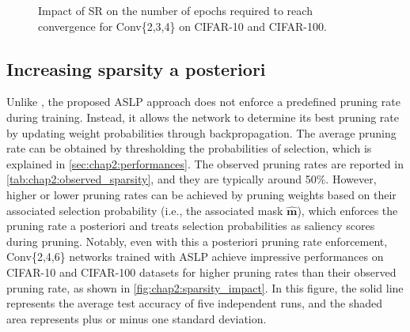 \begin{figure}[htbp]
\centering
{}
\caption{Impact of \acf{SR} on the number of epochs required to reach
convergence for Conv\{2,3,4\} on CIFAR-10 and CIFAR-100.}
\label{fig:chap2:rescale_impact}  
\end{figure}


\subsection{Increasing sparsity a posteriori}
\label{sec:chap2:increasing_sparsity}

Unlike \cite{DBLP:conf/cvpr/RamanujanWKFR20}, the proposed \ac{ASLP} approach
does not enforce a predefined pruning rate during training. Instead, it allows
the network to determine its best pruning rate by updating weight probabilities
through backpropagation. The average pruning rate can be obtained by
thresholding the probabilities of selection, which is explained in
\cref{sec:chap2:performances}. The observed pruning rates are reported in
\cref{tab:chap2:observed_sparsity}, and they are typically around 50\%. However,
higher or lower pruning rates can be achieved by pruning weights based on their
associated selection probability (i.e., the associated mask $\bm{\hat{m}}$),
which enforces the pruning rate a posteriori and treats selection probabilities
as saliency scores during pruning. Notably, even with this a posteriori pruning
rate enforcement, Conv\{2,4,6\} networks trained with \ac{ASLP} achieve impressive
performances on CIFAR-10 and CIFAR-100 datasets for higher pruning rates than
their observed pruning rate, as shown in \cref{fig:chap2:sparsity_impact}. In
this figure, the solid line represents the average test accuracy of five
independent runs, and the shaded area represents plus or minus one standard
deviation.\\

